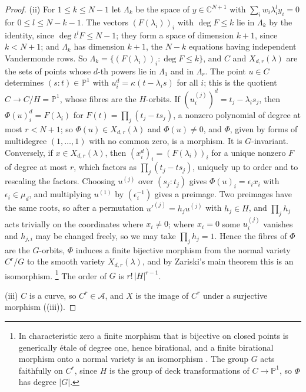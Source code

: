 \documentclass[11pt,reqno]{amsart}
\theoremstyle{plain}
\theoremstyle{definition}
\theoremstyle{remark}
\newcommand{\CC}{\mathbb{C}}
\newcommand{\PP}{\mathbb{P}}
\begin{document}
\begin{proof}
(ii) For $1\le k\le N-1$ let $\Lambda_{k}$ be the space of
$y\in\CC^{N+1}$ with $\sum_{i}w_{i}\lambda_{i}^{l}y_{i}=0$ for
$0\le l\le N-k-1$. The vectors $(F(\lambda_{i}))_{i}$ with $\deg F\le k$ lie
in $\Lambda_{k}$ by the identity, since $\deg t^{l}F\le N-1$; they form a space
of dimension $k+1$, since $k<N+1$; and $\Lambda_{k}$ has dimension $k+1$,
the $N-k$ equations having independent Vandermonde rows. So
$\Lambda_{k}=\{(F(\lambda_{i}))_{i}:\deg F\le k\}$, and $C$ and
$X_{d,r}(\lambda)$ are the sets of points whose $d$-th powers lie in
$\Lambda_{1}$ and in $\Lambda_{r}$. The point $u\in C$ determines
$(s:t)\in\PP^{1}$ with $u_{i}^{d}=\kappa(t-\lambda_{i}s)$ for all $i$; this is
the quotient $C\to C/H=\PP^{1}$, whose fibres are the $H$-orbits. If
$(u^{(j)}_{i})^{d}=t_{j}-\lambda_{i}s_{j}$, then
$\Phi(u)_{i}^{d}=F(\lambda_{i})$ for $F(t)=\prod_{j}(t_{j}-ts_{j})$, a nonzero
polynomial of degree at most $r<N+1$; so $\Phi(u)\in X_{d,r}(\lambda)$ and
$\Phi(u)\ne0$, and $\Phi$, given by forms of multidegree $(1,\dots,1)$ with no
common zero, is a morphism. It is $G$-invariant. Conversely, if $x\in
X_{d,r}(\lambda)$, then $(x_{i}^{d})_{i}=(F(\lambda_{i}))_{i}$ for a unique
nonzero $F$ of degree at most $r$, which factors as
$\prod_{j}(t_{j}-ts_{j})$, uniquely up to order and to rescaling the factors.
Choosing $u^{(j)}$ over $(s_{j}:t_{j})$ gives $\Phi(u)_{i}=\epsilon_{i}x_{i}$
with $\epsilon_{i}\in\mu_{d}$, and multiplying $u^{(1)}$ by
$(\epsilon_{i}^{-1})$ gives a preimage.\enlargethispage{2pt} Two preimages have the same roots, so
after a permutation $u'^{(j)}=h_{j}u^{(j)}$ with $h_{j}\in H$, and $\prod_{j}h_{j}$
acts trivially on the coordinates where $x_{i}\ne0$; where $x_{i}=0$ some
$u^{(j)}_{i}$ vanishes and $h_{j,i}$ may be changed freely, so we may take
$\prod_{j}h_{j}=1$. Hence the fibres of $\Phi$ are the $G$-orbits, $\Phi$
induces a finite bijective morphism from the normal variety $C^{r}/G$ to the
smooth variety $X_{d,r}(\lambda)$, and by Zariski's main theorem this is an
isomorphism.%
\footnote{In characteristic zero a finite morphism that is bijective on
closed points is generically \'etale of degree one, hence birational, and a
finite birational morphism onto a normal variety is an isomorphism
\cite[Chapter~III, Corollary~11.4]{Har77}. The group $G$ acts faithfully on $C^{r}$,
since $H$ is the group of deck transformations of $C\to\PP^{1}$, so
$\Phi$ has degree $|G|$.}
The order of $G$ is $r!\,|H|^{r-1}$.

(iii) $C$ is a curve, so $C^{r}\in\mathcal{A}$, and $X$ is the image of
$C^{r}$ under a surjective morphism ((iii)).


\end{proof}
\end{document}
